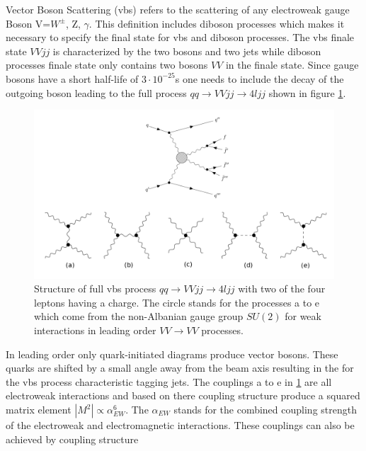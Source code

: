 \documentclass[../Bachelorarbeit.tex]{subfiles}
\begin{document}
\label{sec:VBS}

Vector Boson Scattering (\acrshort{vbs})\cite{Bittrich.27.05.2020} refers to the scattering of any electroweak gauge Boson V=$W^{\pm}$, Z, $\gamma$. This
definition includes diboson processes which makes it necessary to specify the final state for \acrshort{vbs} and diboson processes.
The \acrshort{vbs} finale state $VVjj$ is characterized by the two bosons and two jets while diboson processes finale state only contains
two bosons $VV$ in the finale state. Since gauge bosons have a short half-life of $3 \cdot 10^{-25}$s one needs to include the
decay of the outgoing boson leading to the full process $qq\rightarrow VVjj\rightarrow 4ljj$ shown in figure \ref{fig:feynman_full_VBS}.
\begin{figure}[h]
    \centering
    \includegraphics[width=\textwidth]{images/feynman_full_VBS.png}
    \caption{Structure of full \acrshort{vbs} process $qq\rightarrow VVjj\rightarrow 4ljj$ with two of the four leptons having a charge. The circle stands for the processes a to e
        which come from the non-Albanian gauge group $SU(2)$ for weak interactions in leading order $VV \rightarrow VV$ processes.\cite{Bittrich.27.05.2020}}
    \label{fig:feynman_full_VBS}
\end{figure}
In leading order only quark-initiated diagrams produce vector bosons. These quarks are shifted by a small angle away from
the beam axis resulting in the for the \acrshort{vbs} process characteristic tagging jets. The couplings a to e in \ref{fig:feynman_full_VBS}
are all electroweak interactions and based on there coupling structure produce a squared matrix element
$\left\lvert M^{2} \right\rvert \propto \alpha_{EW}^{6}$. The $\alpha_{EW}$ stands for the combined coupling strength of
the electroweak and electromagnetic interactions. These couplings can also be achieved by coupling structure
\end{document}
